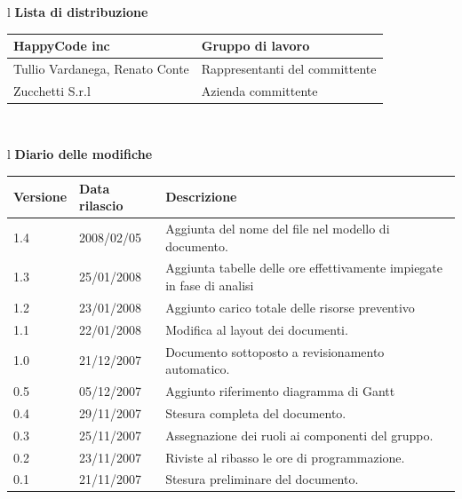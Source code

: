\documentclass[11pt,titlepage,a4paper]{report}
\begin{document}
\begin{center}
\begin{table}[hbtp]
\large{
\begin{tabular}{l}
\Large{\textbf{\textsf{Lista di distribuzione}}} \\
\begin{tabular}{||p{6cm}||p{6cm}||} \hline
{HappyCode inc}& Gruppo di lavoro\\ \hline
{Tullio Vardanega, Renato Conte}& Rappresentanti del committente \\ \hline 
{Zucchetti S.r.l}& Azienda committente\\ \hline
\end{tabular} \\
\end{tabular}
}
\end{table}
\begin{table}[hbtp]
\large{
\begin{tabular}{l}
\Large{\textbf{\textsf{Diario delle modifiche}}} \\
\begin{tabular}{||p{2cm}||p{3.5cm}||p{6cm}||} \hline
\textbf{Versione} & \textbf{Data rilascio} & \textbf{Descrizione} \\ \hline
1.4 & 2008/02/05 & Aggiunta del nome del file nel modello di documento.\\ \hline
1.3 & 25/01/2008 & Aggiunta tabelle delle ore effettivamente impiegate in fase di analisi \\ \hline
1.2 & 23/01/2008 & Aggiunto carico totale delle risorse preventivo \\ \hline
1.1 & 22/01/2008 & Modifica al layout dei documenti.\\ \hline
1.0 & 21/12/2007 & Documento sottoposto a revisionamento automatico.\\ \hline
0.5 & 05/12/2007 & Aggiunto riferimento diagramma di Gantt \\ \hline
0.4 & 29/11/2007 & Stesura completa del documento. \\ \hline
0.3 & 25/11/2007 & Assegnazione dei ruoli ai componenti del gruppo. \\ \hline
0.2 & 23/11/2007 & Riviste al ribasso le ore di programmazione. \\ \hline
0.1 & 21/11/2007 & Stesura preliminare del documento. \\ \hline

\end{tabular} \\
\end{tabular}

}
\end{table}
\end{center}
\end{document}
